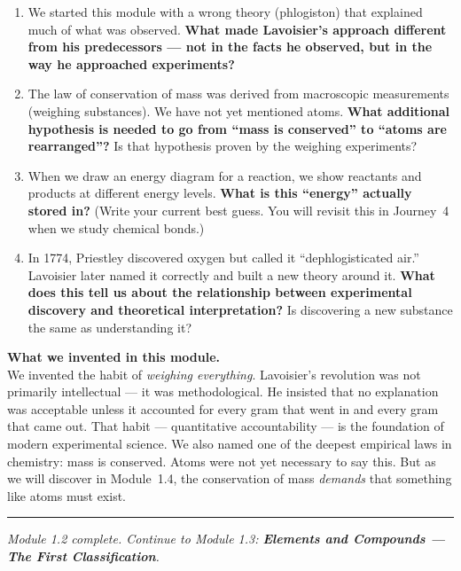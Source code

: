 \documentclass[12pt, a4paper]{book}
\theoremstyle{definition}
\begin{document}
\begin{reflectionbox}
\begin{enumerate}[label=\textbf{R\arabic*.}]
  \item We started this module with a wrong theory (phlogiston)
        that explained much of what was observed.
        \textbf{What made Lavoisier's approach different
        from his predecessors — not in the facts he observed,
        but in the way he approached experiments?}

  \item The law of conservation of mass was derived from
        macroscopic measurements (weighing substances).
        We have not yet mentioned atoms.
        \textbf{What additional hypothesis is needed to go
        from ``mass is conserved'' to ``atoms are rearranged''?}
        Is that hypothesis proven by the weighing experiments?

  \item When we draw an energy diagram for a reaction,
        we show reactants and products at different energy levels.
        \textbf{What is this ``energy'' actually stored in?}
        (Write your current best guess. You will revisit this
        in Journey~4 when we study chemical bonds.)

  \item In 1774, Priestley discovered oxygen but called it
        ``dephlogisticated air.''
        Lavoisier later named it correctly and built
        a new theory around it.
        \textbf{What does this tell us about the relationship
        between experimental discovery and theoretical interpretation?}
        Is discovering a new substance the same as understanding it?
\end{enumerate}
\end{reflectionbox}

\vspace{1.5em}
\begin{center}
\begin{tcolorbox}[
  enhanced, colback=DiscoveryColor!8, colframe=DiscoveryColor,
  width=0.88\textwidth, arc=3pt
]
\centering\sffamily\small
\textbf{What we invented in this module.}\\[4pt]
We invented the habit of \emph{weighing everything}.
Lavoisier's revolution was not primarily intellectual — it was methodological.
He insisted that no explanation was acceptable
unless it accounted for every gram that went in and every gram that came out.
That habit — quantitative accountability — is the foundation
of modern experimental science.
We also named one of the deepest empirical laws in chemistry:
mass is conserved.
Atoms were not yet necessary to say this.
But as we will discover in Module~1.4,
the conservation of mass
\emph{demands} that something like atoms must exist.
\end{tcolorbox}
\end{center}

\vspace{2em}
\noindent\textcolor{JourneyColor!40}{\rule{\textwidth}{0.6pt}}
\begin{center}
\textit{\sffamily\small
Module 1.2 complete. Continue to Module 1.3:
\textbf{Elements and Compounds --- The First Classification}.}
\end{center}
\end{document}
